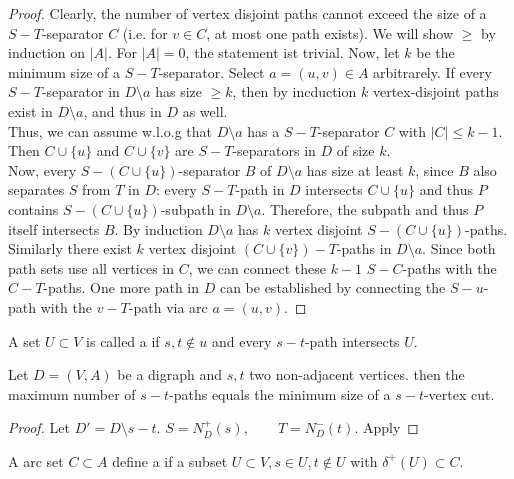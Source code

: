 \begin{proof}
Clearly, the number of vertex disjoint paths cannot exceed the size of a
$S-T$-separator $C$ (i.e. for $v \in C$, at most one path exists). We will
show $\geq$ by induction on $|A|$. For $|A|=0$, the statement ist trivial.
Now, let $k$ be the minimum size of a $S-T$-separator. Select $a=(u,v) \in
A$ arbitrarely. If every $S-T$-separator in $D \setminus a$ has size $\geq
k$, then by incduction $k$ vertex-disjoint paths exist in $D\setminus a$,
and thus in $D$ as well.\\
Thus, we can assume w.l.o.g that $D \setminus a $ has a $S-T$-separator $C$
with $|C| \leq k-1$. Then $C\cup \{u\}$ and $C\cup \{v\}$ are
$S-T$-separators in $D$ of size $k$.\\
Now, every $S-(C\cup\{u\})$-separator $B$ of $D \setminus a$ has size at
least $k$, since $B$ also separates $S$ from $T$ in $D$: every $S-T$-path in
$D$ intersects $C\cup\{u\}$ and thus $P$ contains $S-(C\cup \{u\})$-subpath
in $D\setminus a$. Therefore, the subpath and thus $P$ itself intersects
$B$. By induction $D\setminus a$ has $k$ vertex disjoint
$S-(C\cup\{u\})$-paths. Similarly there exist $k$ vertex disjoint
$(C\cup\{v\})-T$-paths in $D \setminus a$. Since both path sets use all
vertices in $C$, we can connect these $k-1$ $S-C$-paths with the $C-T$-paths.
One more path in $D$ can be established by connecting the $S-u$-path with
the $v-T$-path via arc $a=(u,v)$.
\end{proof}

\begin{defn}
A set $U\subset V$ is called a  if $s,t \notin u$
and every $s-t$-path intersects $U$.
\end {defn}

\begin{cor}
Let $D=(V,A)$ be a digraph and $s,t$ two non-adjacent vertices. then the
maximum number of  $s-t$-paths equals the
minimum size of a $s-t$-vertex cut.
\end{cor}
\begin{proof}
Let $D'=D\setminus s - t.$
$S=N^+_D(s), \qquad T=N_D^-(t)$. Apply %
\end{proof} 

\begin{defn}
A arc set $C\subset A$ define a  if a subset
$U\subset V, s \in U, t \notin U$ with $\delta^+(U)\subset C$.
\end{defn}

